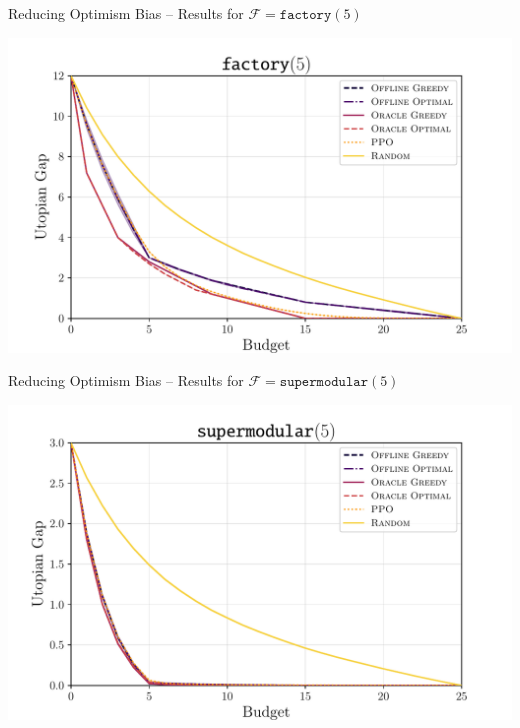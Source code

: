 \documentclass[]{beamer}
\begin{document}
\begin{frame}{Reducing Optimism Bias -- Results for $ \mathcal{F} = \texttt{factory} (5) $}
	\begin{center}
		\includegraphics[width=\textwidth]{figures/factory5.pdf}
	\end{center}
\end{frame}

\begin{frame}{Reducing Optimism Bias -- Results for $ \mathcal{F} = \texttt{supermodular} (5) $}
	\begin{center}
		\includegraphics[width=\textwidth]{figures/convex5.pdf}
	\end{center}
\end{frame}
\end{document}
